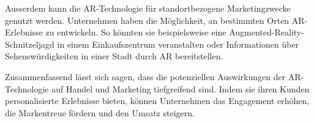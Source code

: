 Ausserdem kann die AR-Technologie für standortbezogene Marketingzwecke genutzt werden. Unternehmen haben die Möglichkeit, an bestimmten Orten AR-Erlebnisse zu entwickeln. So könnten sie beispielsweise eine Augmented-Reality-Schnitzeljagd in einem Einkaufszentrum veranstalten oder Informationen über Sehenswürdigkeiten in einer Stadt durch AR bereitstellen.

Zusammenfassend lässt sich sagen, dass die potenziellen Auswirkungen der AR-Technologie auf Handel und Marketing tiefgreifend sind. Indem sie ihren Kunden personalisierte Erlebnisse bieten, können Unternehmen das Engagement erhöhen, die Markentreue fördern und den Umsatz steigern.


